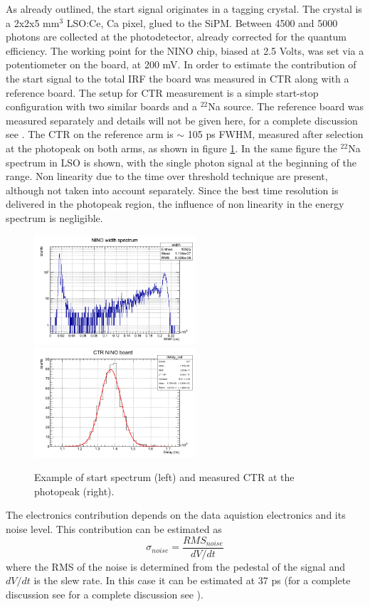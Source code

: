 As already outlined, the start signal originates in a tagging crystal.
The crystal is a 2x2x5 mm$^{3}$ LSO:Ce, Ca pixel, glued to the SiPM. Between 4500 and 5000 photons are collected at the photodetector, already corrected for the quantum efficiency. 
The working point for the NINO chip, biased at 2.5 Volts, was set via a potentiometer on the board, at 200 mV.
In order to estimate the contribution of the start signal to the total IRF the board was measured in CTR along with a reference board.
The setup for CTR measurement is a simple start-stop configuration with two similar boards and a $^{22}$Na source.
The reference board was measured separately and details will not be given here, for a complete discussion see \cite{Gundacker2014}. The CTR on the reference arm is $\sim$ 105 ps FWHM, measured after selection at the photopeak on both arms, as shown in figure \ref{fig:start}.
In the same figure the $^{22}$Na spectrum in LSO is shown, with the single photon signal at the beginning of the range. Non linearity due to the time over threshold technique are present, although not taken into account separately. Since the best time resolution is delivered in the photopeak region, the influence of non linearity in the energy spectrum is negligible. 
\begin{figure}[htbp]
\begin{center}
\includegraphics[width=6cm]{../Pictures/Chapter_8/spectrum_NINO.png}
\includegraphics[width=6cm]{../Pictures/Chapter_8/CTR.png}
\end{center}
\caption[Start characteristics]{Example of start spectrum (left) and measured CTR at the photopeak (right).}
\label{fig:start}
\end{figure}
The electronics contribution depends on the data aquistion electronics and its noise level. This contribution can be estimated as
\begin{equation}
\sigma _{noise} = \frac{RMS _{noise}}{dV/dt}
\end{equation}
where the RMS of the noise is determined from the pedestal of the signal and $dV/dt$ is the slew rate. In this case it can be estimated at 37 ps (for a complete discussion see for a complete discussion see \cite{Gundacker2014}). 

